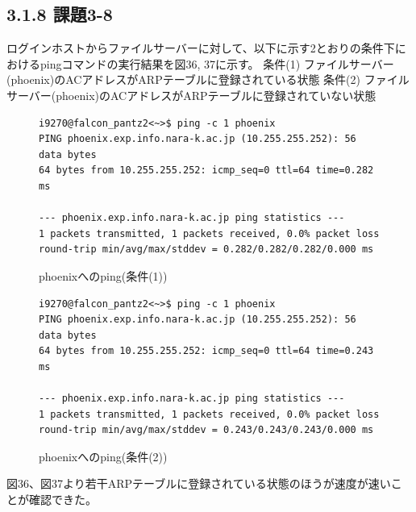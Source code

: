 \documentclass[12pt]{jreport}
\begin{document}
            \subsection*{3.1.8 課題3-8}
                ログインホストからファイルサーバーに対して、以下に示す2とおりの条件下におけるpingコマンドの実行結果を図36, 37に示す。
                条件(1) ファイルサーバー(phoenix)のACアドレスがARPテーブルに登録されている状態
                条件(2) ファイルサーバー(phoenix)のACアドレスがARPテーブルに登録されていない状態
                \begin{figure}[H]
                    \begin{center}
                        \begin{screen}
                            \begin{verbatim}
i9270@falcon_pantz2<~>$ ping -c 1 phoenix
PING phoenix.exp.info.nara-k.ac.jp (10.255.255.252): 56 data bytes
64 bytes from 10.255.255.252: icmp_seq=0 ttl=64 time=0.282 ms

--- phoenix.exp.info.nara-k.ac.jp ping statistics ---
1 packets transmitted, 1 packets received, 0.0% packet loss
round-trip min/avg/max/stddev = 0.282/0.282/0.282/0.000 ms
                            \end{verbatim}
                        \end{screen}
                        \caption{phoenixへのping(条件(1))}
                        \label{36}
                    \end{center}
                \end{figure}
                \begin{figure}[H]
                    \begin{center}
                        \begin{screen}
                            \begin{verbatim}
i9270@falcon_pantz2<~>$ ping -c 1 phoenix
PING phoenix.exp.info.nara-k.ac.jp (10.255.255.252): 56 data bytes
64 bytes from 10.255.255.252: icmp_seq=0 ttl=64 time=0.243 ms

--- phoenix.exp.info.nara-k.ac.jp ping statistics ---
1 packets transmitted, 1 packets received, 0.0% packet loss
round-trip min/avg/max/stddev = 0.243/0.243/0.243/0.000 ms
                            \end{verbatim}
                        \end{screen}
                        \caption{phoenixへのping(条件(2))}
                        \label{37}
                    \end{center}
                \end{figure}
                図36、図37より若干ARPテーブルに登録されている状態のほうが速度が速いことが確認できた。
\end{document}
